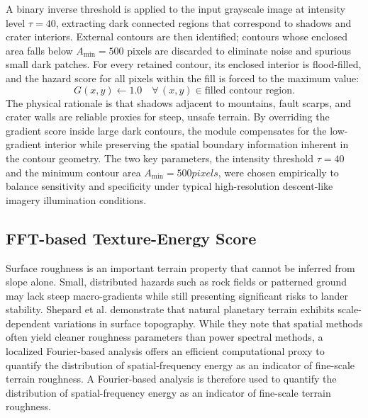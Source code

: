 \documentclass{article}
\begin{document}
A binary inverse threshold is applied to the input grayscale image at intensity level $\tau = 40$, extracting dark connected regions that correspond to shadows and crater interiors. External contours are then identified; contours whose enclosed area falls below $A_{\min} = 500$ pixels are discarded to eliminate noise and spurious small dark patches. For every retained contour, its enclosed interior is flood-filled, and the hazard score for all pixels within the fill is forced to the maximum value:
\begin{equation}
    G(x,y) \leftarrow 1.0 \quad \forall\,(x,y) \in \text{filled contour region}.
\end{equation}
The physical rationale is that shadows adjacent to mountains, fault scarps, and crater walls are reliable proxies for steep, unsafe terrain. By overriding the gradient score inside large dark contours, the module compensates for the low-gradient interior while preserving the spatial boundary information inherent in the contour geometry. The two key parameters, the intensity threshold $\tau = 40$ and the minimum contour area $A_{\min} = 500 pixels$, were chosen empirically to balance sensitivity and specificity under typical high-resolution descent-like imagery illumination conditions.

\subsection{FFT-based Texture-Energy Score}
Surface roughness is an important terrain property that cannot be inferred from slope alone. Small, distributed hazards such as rock fields or patterned ground may lack steep macro-gradients while still presenting significant risks to lander stability. Shepard et al. \cite{shepard2001roughness} demonstrate that natural planetary terrain exhibits scale-dependent variations in surface topography. While they note that spatial methods often yield cleaner roughness parameters than power spectral methods, a localized Fourier-based analysis offers an efficient computational proxy to quantify the distribution of spatial-frequency energy as an indicator of fine-scale terrain roughness. A Fourier-based analysis is therefore used to quantify the distribution of spatial-frequency energy as an indicator of fine-scale terrain roughness.
 
\end{document}
